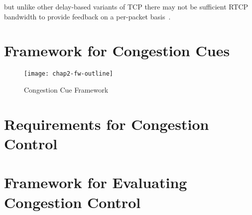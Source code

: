 
but unlike other delay-based variants of TCP there
may not be sufficient RTCP bandwidth to provide feedback on a per-packet
basis~\cite{draft.rmcat.feedback}.



\section{Framework for Congestion Cues}
\label{fw.fw}


\begin{figure}
\texttt{[image: chap2-fw-outline]}
\caption{Congestion Cue Framework}
\label{fig:4:fw}
\end{figure}


\section{Requirements for Congestion Control}
\label{fw.cc.req}

\section{Framework for Evaluating Congestion Control}
\label{fw.cc.eval}

